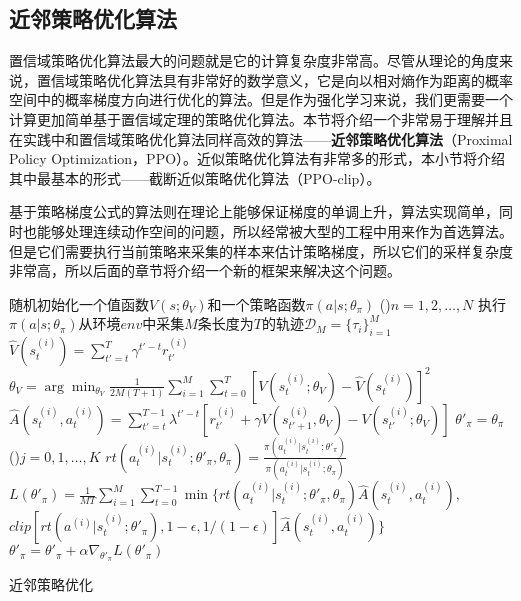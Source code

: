 \subsection{近邻策略优化算法}

置信域策略优化算法最大的问题就是它的计算复杂度非常高。尽管从理论的角度来说，置信域策略优化算法具有非常好的数学意义，它是向以相对熵作为距离的概率空间中的概率梯度方向进行优化的算法。但是作为强化学习来说，我们更需要一个计算更加简单基于置信域定理的策略优化算法。本节将介绍一个非常易于理解并且在实践中和置信域策略优化算法同样高效的算法——\textbf{近邻策略优化算法}\cite{schulman2017proximal}（Proximal Policy Optimization，PPO）。近似策略优化算法有非常多的形式，本小节将介绍其中最基本的形式——截断近似策略优化算法（PPO-clip）。

基于策略梯度公式的算法则在理论上能够保证梯度的单调上升，算法实现简单，同时也能够处理连续动作空间的问题，所以经常被大型的工程中\cite{vinyals2019alphastar,akkaya2019solving,berner2019dota}用来作为首选算法。但是它们需要执行当前策略来采集的样本来估计策略梯度，所以它们的采样复杂度非常高，所以后面的章节将介绍一个新的框架来解决这个问题。

\begin{algorithm}[htbp]
    \LinesNumbered
    随机初始化一个值函数$V(s; \theta_V)$和一个策略函数$\pi(a \vert s; \theta_\pi)$\;
    \For(){$n = 1,2, \ldots, N$}{
        执行$\pi(a \vert s; \theta_\pi)$从环境$env$中采集$M$条长度为$T$的轨迹$\mathcal{D}_M=\{\tau_i\}^{M}_{i=1}$\;
        $\hat V(s^{(i)}_t) = \sum^{T}_{t' = t} \gamma^{t'-t}r^{(i)}_{t'}$\;
        $\theta_V = \arg\min_{\theta_V} \frac{1}{2M(T+1)} \sum^{M}_{i=1}\sum^{T}_{t=0} [V(s^{(i)}_t; \theta_V) - \hat V(s^{(i)}_t)]^2$\;
        $\hat A(s^{(i)}_t, a^{(i)}_t) = \sum^{T-1}_{t' = t} \lambda^{t' - t}[r^{(i)}_{t'} + \gamma V(s^{(i)}_{t'+1}, \theta_V) - V(s^{(i)}_{t'}; \theta_V)]$\;
        $\theta'_\pi = \theta_\pi$\;
        \For(){$j = 0, 1, \ldots, K$}{
            $rt(a^{(i)}_t \vert s^{(i)}_t; \theta'_{\pi}, \theta_{\pi}) = \frac{\pi(a^{(i)}_t \vert s^{(i)}_t; \theta'_{\pi})}{\pi(a^{(i)}_t \vert s^{(i)}_t; \theta_{\pi})}$\;
            $L(\theta'_\pi) = \frac{1}{MT} \sum^{M}_{i=1} \sum^{T-1}_{t=0}\min \{rt(a^{(i)}_t \vert s^{(i)}_t;\theta'_{\pi}, \theta_{\pi}) \hat A(s^{(i)}_t, a^{(i)}_t),$ 
            $clip[rt(a^{(i)} \vert s^{(i)}_t; \theta'_{\pi}), 1 - \epsilon, 1/(1-\epsilon)] \hat A(s^{(i)}_t, a^{(i)}_t)\}$\;
            $\theta'_{\pi} = \theta'_{\pi} + \alpha \nabla_{\theta'_\pi} L(\theta'_\pi)$\;
        }
    }
    \caption{近邻策略优化}
\end{algorithm}

